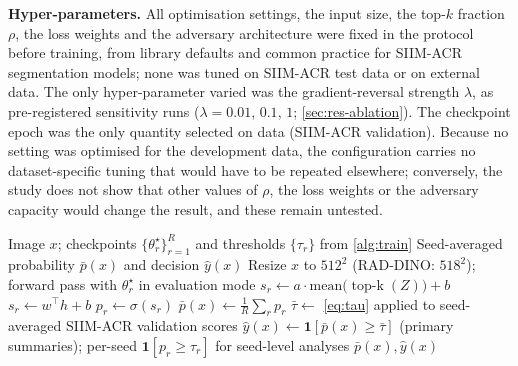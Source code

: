 \documentclass{ieeeaccess}
\DeclareMathOperator*{\topk}{top\text{-}k}
\begin{document}
\textbf{Hyper-parameters.} All optimisation settings, the input size, the top-$k$ fraction $\rho$, the loss weights and the adversary architecture were fixed in the protocol before training, from library defaults and common practice for SIIM-ACR segmentation models; none was tuned on SIIM-ACR test data or on external data. The only hyper-parameter varied was the gradient-reversal strength $\lambda$, as pre-registered sensitivity runs ($\lambda=0.01$, $0.1$, $1$; \cref{sec:res-ablation}). The checkpoint epoch was the only quantity selected on data (SIIM-ACR validation). Because no setting was optimised for the development data, the configuration carries no dataset-specific tuning that would have to be repeated elsewhere; conversely, the study does not show that other values of $\rho$, the loss weights or the adversary capacity would change the result, and these remain untested.

\begin{algorithm}[!t]
\caption{Scoring an image with a trained configuration}
\label{alg:score}
\begin{algorithmic}[1]
\Require Image $x$; checkpoints $\{\theta^\star_r\}_{r=1}^{R}$ and thresholds $\{\tau_r\}$ from \cref{alg:train}
\Ensure Seed-averaged probability $\bar p(x)$ and decision $\hat y(x)$
  \State Resize $x$ to $512^2$ (RAD-DINO: $518^2$); forward pass with $\theta^\star_r$ in evaluation mode
   \State $s_r\gets a\cdot\mathrm{mean}\big(\topk(Z)\big)+b$ 
  \Else \State $s_r\gets w^\top h+b$
  \EndIf
  \State $p_r\gets\sigma(s_r)$ 
\EndFor
\State $\bar p(x)\gets\frac1R\sum_r p_r$ 
\State $\bar\tau\gets$ \cref{eq:tau} applied to seed-averaged SIIM-ACR validation scores\label{line:tau-avg}
\State $\hat y(x)\gets\mathbf{1}[\bar p(x)\ge\bar\tau]$ (primary summaries); per-seed $\mathbf{1}[p_r\ge\tau_r]$ for seed-level analyses
\State \Return $\bar p(x),\hat y(x)$
\end{algorithmic}
\end{algorithm}
\end{document}
